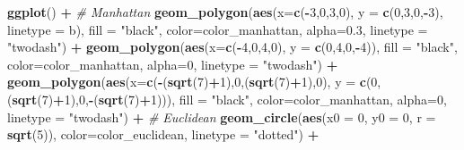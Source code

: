 \documentclass[]{article}
\newenvironment{Shaded}{\begin{snugshade}}{\end{snugshade}}
\newcommand{\CommentTok}[1]{\textcolor[rgb]{0.56,0.35,0.01}{\textit{#1}}}
\newcommand{\DataTypeTok}[1]{\textcolor[rgb]{0.13,0.29,0.53}{#1}}
\newcommand{\DecValTok}[1]{\textcolor[rgb]{0.00,0.00,0.81}{#1}}
\newcommand{\FloatTok}[1]{\textcolor[rgb]{0.00,0.00,0.81}{#1}}
\newcommand{\KeywordTok}[1]{\textcolor[rgb]{0.13,0.29,0.53}{\textbf{#1}}}
\newcommand{\NormalTok}[1]{#1}
\newcommand{\OperatorTok}[1]{\textcolor[rgb]{0.81,0.36,0.00}{\textbf{#1}}}
\newcommand{\StringTok}[1]{\textcolor[rgb]{0.31,0.60,0.02}{#1}}
\begin{document}
\begin{Shaded}
\begin{Highlighting}[]
\KeywordTok{ggplot}\NormalTok{() }\OperatorTok{+}
\StringTok{  }\CommentTok{# Manhattan}
\StringTok{  }\KeywordTok{geom_polygon}\NormalTok{(}\KeywordTok{aes}\NormalTok{(}\DataTypeTok{x=}\KeywordTok{c}\NormalTok{(}\OperatorTok{-}\DecValTok{3}\NormalTok{,}\DecValTok{0}\NormalTok{,}\DecValTok{3}\NormalTok{,}\DecValTok{0}\NormalTok{), }\DataTypeTok{y =} \KeywordTok{c}\NormalTok{(}\DecValTok{0}\NormalTok{,}\DecValTok{3}\NormalTok{,}\DecValTok{0}\NormalTok{,}\OperatorTok{-}\DecValTok{3}\NormalTok{), }\DataTypeTok{linetype =}\NormalTok{ b), }\DataTypeTok{fill =} \StringTok{"black"}\NormalTok{, }\DataTypeTok{color=}\NormalTok{color_manhattan, }\DataTypeTok{alpha=}\FloatTok{0.3}\NormalTok{, }\DataTypeTok{linetype =} \StringTok{"twodash"}\NormalTok{) }\OperatorTok{+}
\StringTok{  }\KeywordTok{geom_polygon}\NormalTok{(}\KeywordTok{aes}\NormalTok{(}\DataTypeTok{x=}\KeywordTok{c}\NormalTok{(}\OperatorTok{-}\DecValTok{4}\NormalTok{,}\DecValTok{0}\NormalTok{,}\DecValTok{4}\NormalTok{,}\DecValTok{0}\NormalTok{), }\DataTypeTok{y =} \KeywordTok{c}\NormalTok{(}\DecValTok{0}\NormalTok{,}\DecValTok{4}\NormalTok{,}\DecValTok{0}\NormalTok{,}\OperatorTok{-}\DecValTok{4}\NormalTok{)), }\DataTypeTok{fill =} \StringTok{"black"}\NormalTok{, }\DataTypeTok{color=}\NormalTok{color_manhattan, }\DataTypeTok{alpha=}\DecValTok{0}\NormalTok{, }\DataTypeTok{linetype =} \StringTok{"twodash"}\NormalTok{) }\OperatorTok{+}
\StringTok{  }\KeywordTok{geom_polygon}\NormalTok{(}\KeywordTok{aes}\NormalTok{(}\DataTypeTok{x=}\KeywordTok{c}\NormalTok{(}\OperatorTok{-}\NormalTok{(}\KeywordTok{sqrt}\NormalTok{(}\DecValTok{7}\NormalTok{)}\OperatorTok{+}\DecValTok{1}\NormalTok{),}\DecValTok{0}\NormalTok{,(}\KeywordTok{sqrt}\NormalTok{(}\DecValTok{7}\NormalTok{)}\OperatorTok{+}\DecValTok{1}\NormalTok{),}\DecValTok{0}\NormalTok{), }\DataTypeTok{y =} \KeywordTok{c}\NormalTok{(}\DecValTok{0}\NormalTok{,(}\KeywordTok{sqrt}\NormalTok{(}\DecValTok{7}\NormalTok{)}\OperatorTok{+}\DecValTok{1}\NormalTok{),}\DecValTok{0}\NormalTok{,}\OperatorTok{-}\NormalTok{(}\KeywordTok{sqrt}\NormalTok{(}\DecValTok{7}\NormalTok{)}\OperatorTok{+}\DecValTok{1}\NormalTok{))), }\DataTypeTok{fill =} \StringTok{"black"}\NormalTok{, }\DataTypeTok{color=}\NormalTok{color_manhattan, }\DataTypeTok{alpha=}\DecValTok{0}\NormalTok{, }\DataTypeTok{linetype =} \StringTok{"twodash"}\NormalTok{) }\OperatorTok{+}
\StringTok{ }\CommentTok{# Euclidean}
\StringTok{  }\KeywordTok{geom_circle}\NormalTok{(}\KeywordTok{aes}\NormalTok{(}\DataTypeTok{x0 =} \DecValTok{0}\NormalTok{, }\DataTypeTok{y0 =} \DecValTok{0}\NormalTok{, }\DataTypeTok{r =} \KeywordTok{sqrt}\NormalTok{(}\DecValTok{5}\NormalTok{)),  }\DataTypeTok{color=}\NormalTok{color_euclidean, }\DataTypeTok{linetype =} \StringTok{"dotted"}\NormalTok{) }\OperatorTok{+}

\end{Highlighting}
\end{Shaded}
\end{document}
